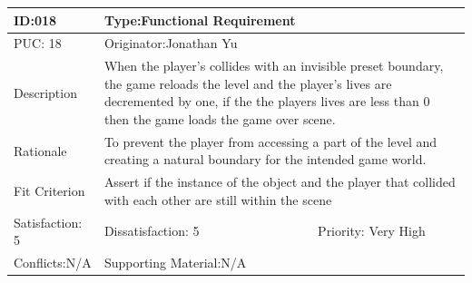 \documentclass{article}
\begin{document}
	\begin{table}[H]

		\begin{tabular}{|l|l|l|}
			\hline
			ID:018 & \multicolumn{2}{l|}{Type:Functional Requirement} \\ \hline
			PUC: 18& \multicolumn{2}{l|}{Originator:Jonathan Yu} \\ \hline
			Description & \multicolumn{2}{m{0.85\textwidth}|}{When the player’s collides with an invisible preset boundary, the game reloads the level and the player’s lives are decremented by one, if the the players lives are less than 0 then the game loads the game over scene.} \\ \hline
			Rationale & \multicolumn{2}{m{0.85\textwidth}|}{To prevent the player from accessing a part of the level and creating a natural boundary for the intended game world.} \\ \hline
			Fit Criterion & \multicolumn{2}{m{0.85\textwidth}|}{Assert if the instance of the object and the player that collided with each other are still within the scene} \\ \hline
			Satisfaction: 5 & Dissatisfaction: 5 & Priority: Very High \\ \hline
			Conflicts:N/A & Supporting Material:N/A &  \\ \hline
		\end{tabular}
	\end{table}
\end{document}
